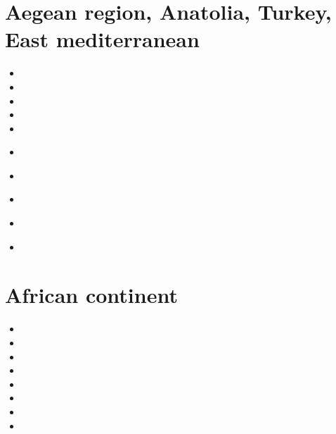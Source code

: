 
\section{Aegean region, Anatolia, Turkey, East mediterranean}

\begin{small}
\begin{itemize}
\item[\nineteenseventyeight] 
\item[\nineteenninetynine] 
\item[\twothousandthree] 
\item[\twothousandten] 
\item[\twothousandeleven] 
\item[\twothousandthirteen] 
\\ 
\item[\twothousandseventeen] 
\item[\twothousandtwenty] 
 \\
\item[\twothousandtwentyone] 
 \\
\item[\twothousandtwentythree]
\end{itemize}
\end{small}

\section{African continent}

\begin{small}
\begin{itemize}
\item[\nineteenninetyfour]
\item[\nineteenninetynine]
\item[\twothousandeleven]
\item[\twothousandtwelve]
\item[\twothousandfourteen]
\item[\twothousandseventeen]
\item[\twothousandeighteen]
\item[\twothousandtwenty]
\end{itemize}
\end{small}

